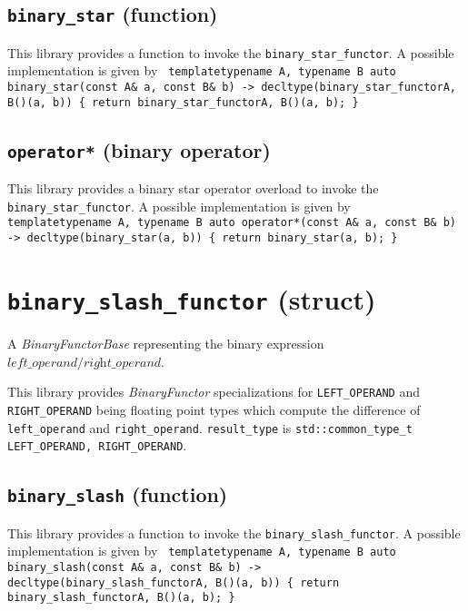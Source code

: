 \documentclass[oneside]{book}
\begin{document}
\subsection{\texttt{binary\_star} (function)}
This library provides a function to invoke the \texttt{binary\_star\_functor}.
A possible implementation is given by\newline
\texttt{
template\textlangle typename A, typename B\textrangle\newline
auto binary\_star(const A\& a, const B\& b) -> decltype(binary\_star\_functor\textlangle A, B\textrangle()(a, b))\newline
\{ return binary\_star\_functor\textlangle A, B\textrangle()(a, b); \}
}

\subsection{\texttt{operator*} (binary operator)}
This library provides a binary star operator overload to invoke the \texttt{binary\_star\_functor}.
A possible implementation is given by\newline
\texttt{
template\textlangle typename A, typename B\textrangle\newline
auto operator*(const A\& a, const B\& b) -> decltype(binary\_star(a, b))\newline
\{ return binary\_star(a, b); \}
}

\section{\texttt{binary\_slash\_functor} (struct)}
A \textit{BinaryFunctorBase} representing the binary expression $\textit{left\_operand} / \textit{right\_operand}$.\newline

\noindent{}This library provides \textit{BinaryFunctor}         specializations for
\texttt{LEFT\_OPERAND} and   \texttt{RIGHT\_OPERAND} being     floating point types
which compute the difference of \texttt{left\_operand} and \texttt{right\_operand}.
\texttt{result\_type} is \texttt{std::common\_type\_t  \textlangle   LEFT\_OPERAND,
RIGHT\_OPERAND\textrangle}.

\subsection{\texttt{binary\_slash} (function)}
This library provides a function to invoke the \texttt{binary\_slash\_functor}.
A possible implementation is given by\newline
\texttt{
template\textlangle typename A, typename B\textrangle\newline
auto binary\_slash(const A\& a, const B\& b) -> decltype(binary\_slash\_functor\textlangle A, B\textrangle()(a, b))\newline
\{ return binary\_slash\_functor\textlangle A, B\textrangle()(a, b); \}
}
\end{document}
